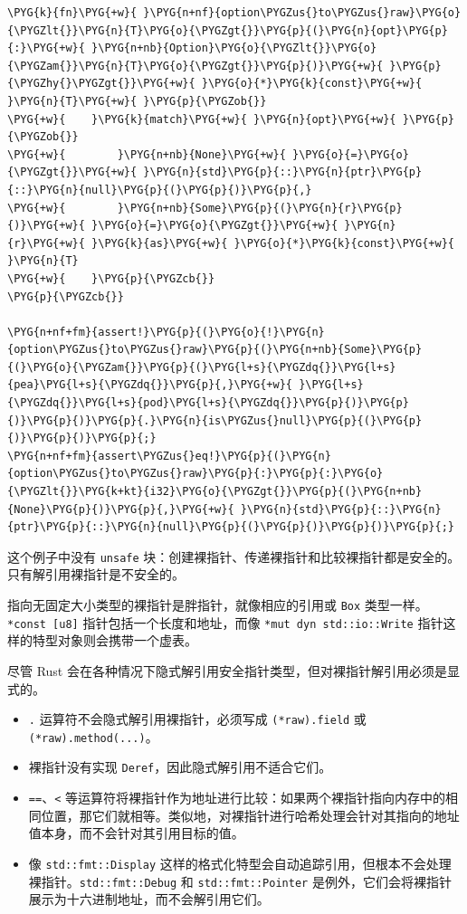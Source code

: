 \begin{Verbatim}[commandchars=\\\{\},breaklines=true,breakanywhere=true,fontsize=\codefont,xleftmargin=17bp]
\PYG{k}{fn}\PYG{+w}{ }\PYG{n+nf}{option\PYGZus{}to\PYGZus{}raw}\PYG{o}{\PYGZlt{}}\PYG{n}{T}\PYG{o}{\PYGZgt{}}\PYG{p}{(}\PYG{n}{opt}\PYG{p}{:}\PYG{+w}{ }\PYG{n+nb}{Option}\PYG{o}{\PYGZlt{}}\PYG{o}{\PYGZam{}}\PYG{n}{T}\PYG{o}{\PYGZgt{}}\PYG{p}{)}\PYG{+w}{ }\PYG{p}{\PYGZhy{}\PYGZgt{}}\PYG{+w}{ }\PYG{o}{*}\PYG{k}{const}\PYG{+w}{ }\PYG{n}{T}\PYG{+w}{ }\PYG{p}{\PYGZob{}}
\PYG{+w}{    }\PYG{k}{match}\PYG{+w}{ }\PYG{n}{opt}\PYG{+w}{ }\PYG{p}{\PYGZob{}}
\PYG{+w}{        }\PYG{n+nb}{None}\PYG{+w}{ }\PYG{o}{=}\PYG{o}{\PYGZgt{}}\PYG{+w}{ }\PYG{n}{std}\PYG{p}{::}\PYG{n}{ptr}\PYG{p}{::}\PYG{n}{null}\PYG{p}{(}\PYG{p}{)}\PYG{p}{,}
\PYG{+w}{        }\PYG{n+nb}{Some}\PYG{p}{(}\PYG{n}{r}\PYG{p}{)}\PYG{+w}{ }\PYG{o}{=}\PYG{o}{\PYGZgt{}}\PYG{+w}{ }\PYG{n}{r}\PYG{+w}{ }\PYG{k}{as}\PYG{+w}{ }\PYG{o}{*}\PYG{k}{const}\PYG{+w}{ }\PYG{n}{T}
\PYG{+w}{    }\PYG{p}{\PYGZcb{}}
\PYG{p}{\PYGZcb{}}

\PYG{n+nf+fm}{assert!}\PYG{p}{(}\PYG{o}{!}\PYG{n}{option\PYGZus{}to\PYGZus{}raw}\PYG{p}{(}\PYG{n+nb}{Some}\PYG{p}{(}\PYG{o}{\PYGZam{}}\PYG{p}{(}\PYG{l+s}{\PYGZdq{}}\PYG{l+s}{pea}\PYG{l+s}{\PYGZdq{}}\PYG{p}{,}\PYG{+w}{ }\PYG{l+s}{\PYGZdq{}}\PYG{l+s}{pod}\PYG{l+s}{\PYGZdq{}}\PYG{p}{)}\PYG{p}{)}\PYG{p}{)}\PYG{p}{.}\PYG{n}{is\PYGZus{}null}\PYG{p}{(}\PYG{p}{)}\PYG{p}{)}\PYG{p}{;}
\PYG{n+nf+fm}{assert\PYGZus{}eq!}\PYG{p}{(}\PYG{n}{option\PYGZus{}to\PYGZus{}raw}\PYG{p}{:}\PYG{p}{:}\PYG{o}{\PYGZlt{}}\PYG{k+kt}{i32}\PYG{o}{\PYGZgt{}}\PYG{p}{(}\PYG{n+nb}{None}\PYG{p}{)}\PYG{p}{,}\PYG{+w}{ }\PYG{n}{std}\PYG{p}{::}\PYG{n}{ptr}\PYG{p}{::}\PYG{n}{null}\PYG{p}{(}\PYG{p}{)}\PYG{p}{)}\PYG{p}{;}
\end{Verbatim}

这个例子中没有 \texttt{unsafe} 块：创建裸指针、传递裸指针和比较裸指针都是安全的。只有解引用裸指针是不安全的。

指向无固定大小类型的裸指针是胖指针，就像相应的引用或 \texttt{Box} 类型一样。\texttt{*const [u8]} 指针包括一个长度和地址，而像 \texttt{*mut dyn std::io::Write} 指针这样的特型对象则会携带一个虚表。

尽管 Rust 会在各种情况下隐式解引用安全指针类型，但对裸指针解引用必须是显式的。

\begin{itemize}
\item \texttt{.} 运算符不会隐式解引用裸指针，必须写成 \texttt{(*raw).field} 或 \texttt{(*raw).method(...)}。
\item 裸指针没有实现 \texttt{Deref}，因此隐式解引用不适合它们。
\item \texttt{==}、\texttt{<} 等运算符将裸指针作为地址进行比较：如果两个裸指针指向内存中的相同位置，那它们就相等。类似地，对裸指针进行哈希处理会针对其指向的地址值本身，而不会针对其引用目标的值。
\item 像 \texttt{std::fmt::Display} 这样的格式化特型会自动追踪引用，但根本不会处理裸指针。\texttt{std::fmt::Debug} 和 \texttt{std::fmt::Pointer} 是例外，它们会将裸指针展示为十六进制地址，而不会解引用它们。
\end{itemize}

